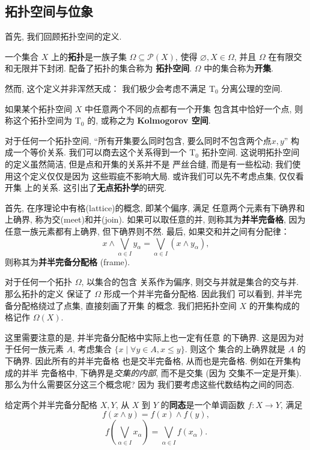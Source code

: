 \subsection{拓扑空间与位象}
首先, 我们回顾拓扑空间的定义.
\begin{definition}
一个集合 \(X\) 上的\textbf{拓扑}是一族子集 \(\Omega \subseteq \mathcal P(X)\),
使得 \(\varnothing, X \in \Omega\), 并且
\(\Omega\) 在有限交和无限并下封闭. 配备了拓扑的集合称为%
\textbf{拓扑空间}. \(\Omega\) 中的集合称为\textbf{开集}.
\end{definition}
然而, 这个定义并非浑然天成： 我们极少会考虑不满足 T\(_0\)
分离公理的空间.
\begin{definition}
如果某个拓扑空间 \(X\) 中任意两个不同的点都有一个开集
包含其中恰好一个点, 则称这个拓扑空间为 T\(_0\) 的,
或称之为 \textbf{Kolmogorov 空间}.
\end{definition}
对于任何一个拓扑空间, “所有开集要么同时包含, 要么同时不包含两个点\(x,y\)”
构成一个等价关系. 我们可以商去这个关系得到一个 T\(_0\) 拓扑空间.
这说明拓扑空间的定义虽然简洁, 但是点和开集的关系并不是
严丝合缝, 而是有一些松动; 我们使用这个定义仅仅是因为
这些瑕疵不影响大局. 或许我们可以先不考虑点集, 仅仅看开集
上的关系. 这引出了\textbf{无点拓扑学}的研究.

首先, 在序理论中有格(lattice)的概念, 即某个偏序, 满足
任意两个元素有下确界和上确界, 称为交(meet)和并(join).
如果可以取任意的并, 则称其为\textbf{并半完备格},
因为任意一族元素都有上确界, 但下确界则不然.
最后, 如果交和并之间有分配律：
\[x \wedge \bigvee_{\alpha \in I} y_\alpha
= \bigvee_{\alpha \in I} (x \wedge y_\alpha),\]
则称其为\textbf{并半完备分配格} (frame).

对于任何一个拓扑 \(\Omega\), 以集合的包含
关系作为偏序, 则交与并就是集合的交与并. 那么拓扑的定义
保证了 \(\Omega\) 形成一个并半完备分配格. 因此我们
可以看到, 并半完备分配格绕过了点集, 直接刻画了开集
的概念. 我们把拓扑空间 \(X\) 的开集构成的格记作 \(\Omega(X)\).

这里需要注意的是, 并半完备分配格中实际上也一定有任意
的下确界. 这是因为对于任何一族元素 \(A\), 考虑集合
\(\{x \mid \forall y \in A, x \le y\}\). 则这个
集合的上确界就是 \(A\) 的下确界. 因此所有的并半完备格
也是交半完备格, 从而也是完备格. 例如在开集构成的并半
完备格中, 下确界是\emph{交集的内部}, 而不是交集 (因为
交集不一定是开集). 那么为什么需要区分这三个概念呢? 因为
我们要考虑这些代数结构之间的同态.

\begin{definition}
给定两个并半完备分配格 \(X, Y\), 从 \(X\) 到 \(Y\)
的\textbf{同态}是一个单调函数 \(f : X \to Y\), 满足
\[f(x\wedge y) = f(x) \wedge f(y),\]
\[f\left(\bigvee_{\alpha \in I} x_\alpha\right)
= \bigvee_{\alpha \in I} f(x_\alpha).\]
\end{definition}

